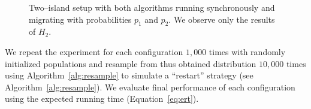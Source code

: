 \documentclass{sig-alternate}
\begin{document}
\begin{figure}[ht!]
    \label{graph:twoisl}
    \caption{Two--island setup with both algorithms running synchronously and migrating with probabilities $p_1$ and $p_2$. We observe only the results of $H_2$.}

\end{figure}
We repeat the experiment for each configuration $1,000$ times with randomly initialized populations and resample from thus obtained distribution $10,000$ times using Algorithm~\ref{alg:resample} to simulate a ``restart'' strategy (see Algorithm~\ref{alg:resample}).
We evaluate final performance of each configuration using the expected running time (Equation~\ref{eq:ert}).
\end{document}

